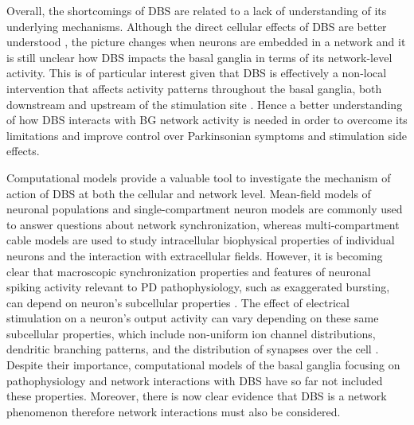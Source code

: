 %
%
Overall, the shortcomings of DBS are related to a lack of understanding of its underlying
mechanisms. Although the direct cellular effects of DBS are better understood \cite{chiken_mechanism_2016,mcintyre_deep_2016,jakobs_cellular_2019}, the picture
changes when neurons are embedded in a network and it is still unclear how DBS
impacts the basal ganglia in terms of its network-level activity.
This is of particular interest given that DBS is effectively a non-local intervention that
affects activity patterns throughout the basal ganglia, both downstream and upstream of the stimulation site
\cite{dorval_deep_2008,li_resonant_2007}. Hence a better understanding of how DBS
interacts with BG network activity is needed in order to overcome its limitations
and improve control over Parkinsonian symptoms and stimulation side effects.
%
%

%
%
%
Computational models provide a valuable tool to investigate the mechanism of action
of DBS at both the cellular and network level. Mean-field models of neuronal
populations and single-compartment neuron models are commonly used to answer
questions about network synchronization, whereas multi-compartment cable models
are used to study intracellular biophysical properties of individual neurons
and the interaction with extracellular fields.
However, it is becoming clear that macroscopic synchronization
properties and features of neuronal spiking activity relevant to PD pathophysiology,
such as exaggerated bursting, can depend on neuron's subcellular properties
\cite{chan_hcn2_2004,gillies_membrane_2005,schultheiss_phase_2010,farries_biophysical_2012,crook_dendritic_1998,goldberg_response_2007}.
%
The effect of electrical stimulation on a neuron's output activity can vary depending
on these same subcellular properties, which include non-uniform ion channel distributions,
dendritic branching patterns, and the distribution of synapses over the cell
\cite{rattay_which_2010,yousif_spatiotemporal_2012,steiner_connectivity_2019}.
%
Despite their importance, computational models of the basal ganglia
focusing on pathophysiology and network interactions with DBS have so far not
included these properties.
%
Moreover, there is now clear evidence that DBS is a network phenomenon \cite{mcintyre_network_2010}
therefore network interactions must also be considered.

